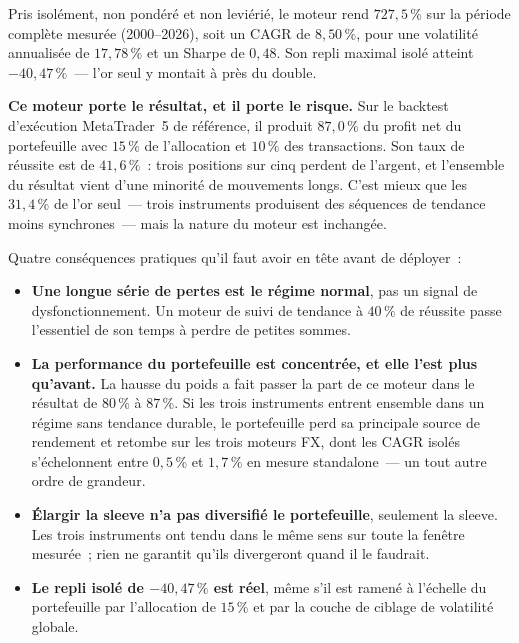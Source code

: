 \documentclass[11pt, a4paper]{scrartcl}
\begin{document}
Pris isolément, non pondéré et non leviérié, le moteur rend $727{,}5\,\%$ sur la
période complète mesurée (2000--2026), soit un CAGR de $8{,}50\,\%$, pour une
volatilité annualisée de $17{,}78\,\%$ et un Sharpe de $0{,}48$. Son repli maximal
isolé atteint $-40{,}47\,\%$~--- l'or seul y montait à près du double.

\begin{warningbox}
\textbf{Ce moteur porte le résultat, et il porte le risque.} Sur le backtest
d'exécution MetaTrader~5 de référence, il produit $87{,}0\,\%$ du profit net du
portefeuille avec $15\,\%$ de l'allocation et $10\,\%$ des transactions. Son taux
de réussite est de $41{,}6\,\%$~: trois positions sur cinq perdent de l'argent, et
l'ensemble du résultat vient d'une minorité de mouvements longs. C'est mieux que
les $31{,}4\,\%$ de l'or seul~--- trois instruments produisent des séquences de
tendance moins synchrones~--- mais la nature du moteur est inchangée.

\smallskip
Quatre conséquences pratiques qu'il faut avoir en tête avant de déployer~:
\begin{itemize}
\item \textbf{Une longue série de pertes est le régime normal}, pas un signal de
      dysfonctionnement. Un moteur de suivi de tendance à $40\,\%$ de réussite
      passe l'essentiel de son temps à perdre de petites sommes.
\item \textbf{La performance du portefeuille est concentrée, et elle l'est plus
      qu'avant.} La hausse du poids a fait passer la part de ce moteur dans le
      résultat de $80\,\%$ à $87\,\%$. Si les trois instruments entrent ensemble
      dans un régime sans tendance durable, le portefeuille perd sa principale
      source de rendement et retombe sur les trois moteurs FX, dont les CAGR isolés
      s'échelonnent entre $0{,}5\,\%$ et $1{,}7\,\%$ en mesure standalone~--- un tout
      autre ordre de grandeur.
\item \textbf{Élargir la sleeve n'a pas diversifié le portefeuille}, seulement la
      sleeve. Les trois instruments ont tendu dans le même sens sur toute la
      fenêtre mesurée~; rien ne garantit qu'ils divergeront quand il le faudrait.
\item \textbf{Le repli isolé de $-40{,}47\,\%$ est réel}, même s'il est ramené à
      l'échelle du portefeuille par l'allocation de $15\,\%$ et par la couche de
      ciblage de volatilité globale.
\end{itemize}
\end{warningbox}
\end{document}
